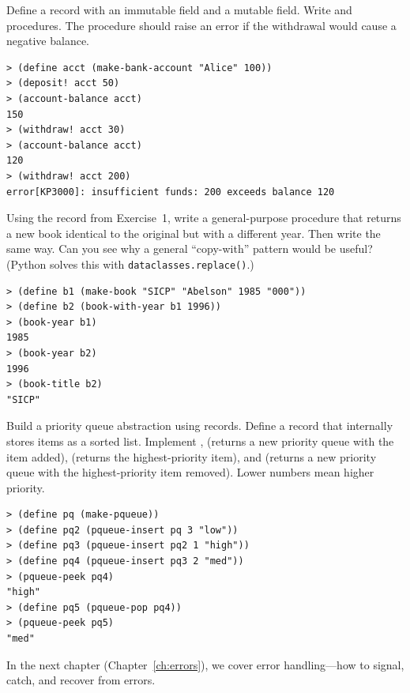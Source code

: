 \begin{exercise}
Define a  record with an immutable  field and a mutable  field. Write  and  procedures. The  procedure should raise an error if the withdrawal would cause a negative balance.

\begin{lstlisting}[style=repl]
> (define acct (make-bank-account "Alice" 100))
> (deposit! acct 50)
> (account-balance acct)
150
> (withdraw! acct 30)
> (account-balance acct)
120
> (withdraw! acct 200)
error[KP3000]: insufficient funds: 200 exceeds balance 120
\end{lstlisting}
\end{exercise}

\begin{exercise}
Using the  record from Exercise~1, write a general-purpose  procedure that returns a new book identical to the original but with a different year. Then write  the same way. Can you see why a general ``copy-with'' pattern would be useful? (Python solves this with \texttt{dataclasses.replace()}.)

\begin{lstlisting}[style=repl]
> (define b1 (make-book "SICP" "Abelson" 1985 "000"))
> (define b2 (book-with-year b1 1996))
> (book-year b1)
1985
> (book-year b2)
1996
> (book-title b2)
"SICP"
\end{lstlisting}
\end{exercise}

\begin{exercise}
Build a priority queue abstraction using records. Define a  record that internally stores items as a sorted list. Implement ,  (returns a new priority queue with the item added),  (returns the highest-priority item), and  (returns a new priority queue with the highest-priority item removed). Lower numbers mean higher priority.

\begin{lstlisting}[style=repl]
> (define pq (make-pqueue))
> (define pq2 (pqueue-insert pq 3 "low"))
> (define pq3 (pqueue-insert pq2 1 "high"))
> (define pq4 (pqueue-insert pq3 2 "med"))
> (pqueue-peek pq4)
"high"
> (define pq5 (pqueue-pop pq4))
> (pqueue-peek pq5)
"med"
\end{lstlisting}
\end{exercise}

In the next chapter (Chapter~\ref{ch:errors}), we cover error handling---how to signal, catch, and recover from errors.

\chapterend
